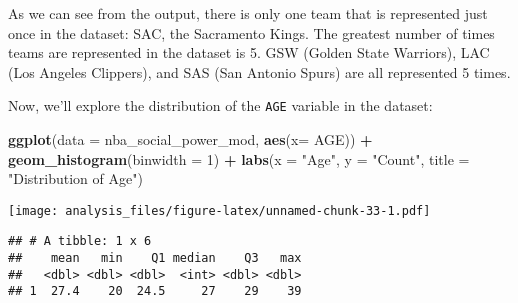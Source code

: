 \documentclass[]{article}
\newenvironment{Shaded}{\begin{snugshade}}{\end{snugshade}}
\newcommand{\DataTypeTok}[1]{\textcolor[rgb]{0.13,0.29,0.53}{#1}}
\newcommand{\DecValTok}[1]{\textcolor[rgb]{0.00,0.00,0.81}{#1}}
\newcommand{\FloatTok}[1]{\textcolor[rgb]{0.00,0.00,0.81}{#1}}
\newcommand{\KeywordTok}[1]{\textcolor[rgb]{0.13,0.29,0.53}{\textbf{#1}}}
\newcommand{\NormalTok}[1]{#1}
\newcommand{\OperatorTok}[1]{\textcolor[rgb]{0.81,0.36,0.00}{\textbf{#1}}}
\newcommand{\StringTok}[1]{\textcolor[rgb]{0.31,0.60,0.02}{#1}}
\begin{document}
As we can see from the output, there is only one team that is
represented just once in the dataset: SAC, the Sacramento Kings. The
greatest number of times teams are represented in the dataset is 5. GSW
(Golden State Warriors), LAC (Los Angeles Clippers), and SAS (San
Antonio Spurs) are all represented 5 times.

Now, we'll explore the distribution of the \texttt{AGE} variable in the
dataset:

\begin{Shaded}
\begin{Highlighting}[]
\KeywordTok{ggplot}\NormalTok{(}\DataTypeTok{data =}\NormalTok{ nba_social_power_mod, }\KeywordTok{aes}\NormalTok{(}\DataTypeTok{x=}\NormalTok{ AGE)) }\OperatorTok{+}\StringTok{ }
\StringTok{  }\KeywordTok{geom_histogram}\NormalTok{(}\DataTypeTok{binwidth =} \DecValTok{1}\NormalTok{) }\OperatorTok{+}
\StringTok{  }\KeywordTok{labs}\NormalTok{(}\DataTypeTok{x =} \StringTok{"Age"}\NormalTok{, }\DataTypeTok{y =} \StringTok{"Count"}\NormalTok{, }\DataTypeTok{title =} \StringTok{"Distribution of Age"}\NormalTok{)}
\end{Highlighting}
\end{Shaded}

\texttt{[image: analysis\_files/figure-latex/unnamed-chunk-33-1.pdf]}

\begin{Shaded}
\end{Shaded}

\begin{verbatim}
## # A tibble: 1 x 6
##    mean   min    Q1 median    Q3   max
##   <dbl> <dbl> <dbl>  <int> <dbl> <dbl>
## 1  27.4    20  24.5     27    29    39
\end{verbatim}

\begin{Shaded}
\end{Shaded}
\end{document}
